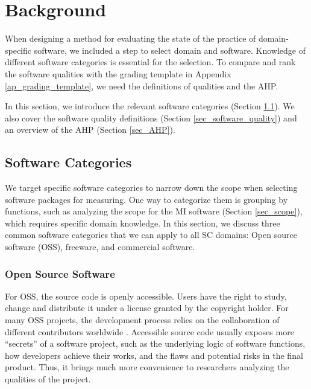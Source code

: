 \chapter{Background}
\label{ch_background}

When designing a method for evaluating the state of the practice of domain-specific software, we included a step to select domain and software. Knowledge of different software categories is essential for the selection. To compare and rank the software qualities with the grading template in Appendix \ref{ap_grading_template}, we need the definitions of qualities and the AHP.

In this section, we introduce the relevant software categories (Section \ref{sec_software_categories}). We also cover the software quality definitions (Section \ref{sec_software_quality}) and an overview of the AHP (Section \ref{sec_AHP}).

\section{Software Categories}
\label{sec_software_categories}
We target specific software categories to narrow down the scope when selecting software packages for measuring. One way to categorize them is grouping by functions, such as analyzing the scope for the MI software (Section \ref{sec_scope}), which requires specific domain knowledge. In this section, we discuss three common software categories that we can apply to all SC domains: Open source software (OSS), freeware, and commercial software.

\subsection{Open Source Software}
\label{sec_open_source_software}
For OSS, the source code is openly accessible. Users have the right to study, change and distribute it under a license granted by the copyright holder. For many OSS projects, the development process relies on the collaboration of different contributors worldwide \cite{Corbly2014}. Accessible source code usually exposes more ``secrets'' of a software project, such as the underlying logic of software functions, how developers achieve their works, and the flaws and potential risks in the final product. Thus, it brings much more convenience to researchers analyzing the qualities of the project.

